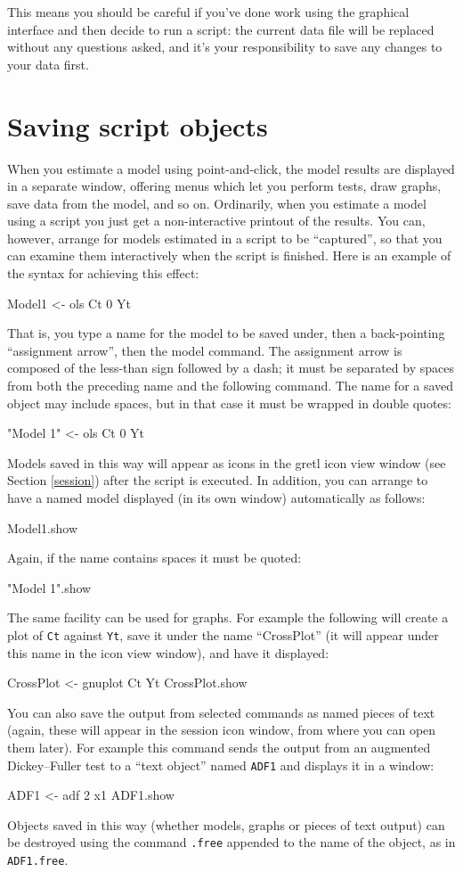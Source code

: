 This means you should be careful if you've done work using the
graphical interface and then decide to run a script: the current data
file will be replaced without any questions asked, and it's your
responsibility to save any changes to your data first.


\section{Saving script objects}
\label{sect-script-objects}

When you estimate a model using point-and-click, the model results are
displayed in a separate window, offering menus which let you perform
tests, draw graphs, save data from the model, and so on.  Ordinarily,
when you estimate a model using a script you just get a
non-interactive printout of the results.  You can, however, arrange
for models estimated in a script to be ``captured'', so that you can
examine them interactively when the script is finished.  Here is an
example of the syntax for achieving this effect:
    
\begin{code}
Model1 <- ols Ct 0 Yt
\end{code}
That is, you type a name for the model to be saved under, then a
back-pointing ``assignment arrow'', then the model command. The
assignment arrow is composed of the less-than sign followed by a dash;
it must be separated by spaces from both the preceding name and the
following command. The name for a saved object may include spaces, but
in that case it must be wrapped in double quotes:
\begin{code}
"Model 1" <- ols Ct 0 Yt
\end{code}
Models saved in this way will appear as icons in the gretl
icon view window (see Section \ref{session}) after the script is
executed.  In addition, you can arrange to have a named model
displayed (in its own window) automatically as follows:
\begin{code}
Model1.show
\end{code}
Again, if the name contains spaces it must be quoted:
\begin{code}
"Model 1".show
\end{code}
The same facility can be used for graphs.  For example the following
will create a plot of \verb+Ct+ against \verb+Yt+, save it under the
name ``CrossPlot'' (it will appear under this name in the icon
view window), and have it displayed:
\begin{code}
CrossPlot <- gnuplot Ct Yt
CrossPlot.show
\end{code}
You can also save the output from selected commands as named pieces of
text (again, these will appear in the session icon window, from where
you can open them later).  For example this command sends the output
from an augmented Dickey--Fuller test to a ``text object'' named
\verb+ADF1+ and displays it in a window:
\begin{code}
ADF1 <- adf 2 x1
ADF1.show
\end{code}
Objects saved in this way (whether models, graphs or pieces of text
output) can be destroyed using the command \verb+.free+ appended to
the name of the object, as in \verb+ADF1.free+.

